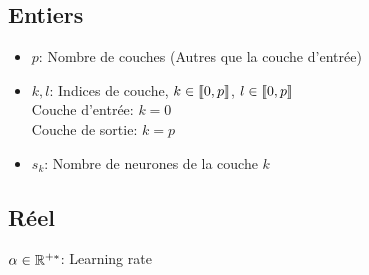 \subsection{Entiers}
	\begin{itemize}
		\item $p$: Nombre de couches (Autres que la couche d'entrée)\\
		\item $k, l$: Indices de couche, $k\in\left\llbracket0, p\right\rrbracket$, $l\in\left\llbracket0, p\right\rrbracket$\\
		      Couche d'entrée: $k = 0$\\
		      Couche de sortie: $k = p$\\
		\item $s_k$: Nombre de neurones de la couche $k$\\
	\end{itemize}
\subsection{Réel}
$\alpha\in\mathbb{R}^{+*}$: Learning rate\\


